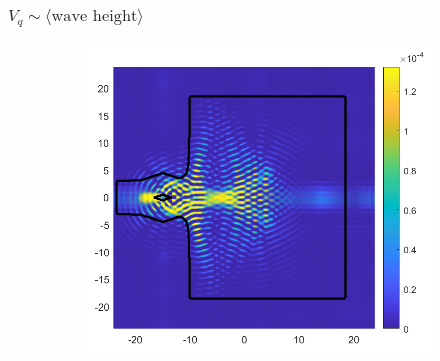 \documentclass[compress,10pt,usenames,dvipsnames]{beamer}
\theoremstyle{remark}
\begin{document}
\begin{frame}\frametitle{$V_q\sim\langle \text{wave height}\rangle$}
	\begin{figure}
		\begin{subfigure}[t]{.5\textwidth}
			\centering
			\includegraphics[scale=0.3]{Figures/potential1.png}
			

\end{subfigure}
\end{figure}
\end{frame}
\end{document}
